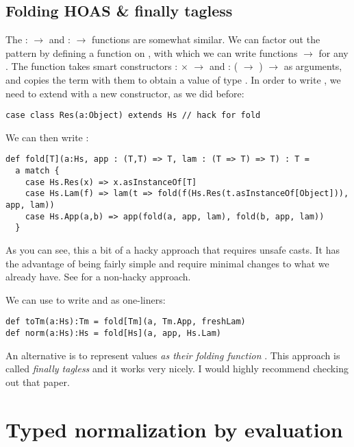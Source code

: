 \subsection{Folding HOAS \& finally tagless}

The  :  $\to$  and  :  $\to$  functions are somewhat similar.
We can factor out the pattern by defining a  function on , with which we can write functions  $\to$  for any .
The  function takes smart constructors  :  $\times$  $\to$  and  : ( $\to$ ) $\to$  as arguments, and copies the  term with them to obtain a value of type .
In order to write , we need to extend  with a new constructor, as we did before:

\begin{lstlisting}
case class Res(a:Object) extends Hs // hack for fold
\end{lstlisting}

We can then write :

\begin{lstlisting}
def fold[T](a:Hs, app : (T,T) => T, lam : (T => T) => T) : T =
  a match {
    case Hs.Res(x) => x.asInstanceOf[T]
    case Hs.Lam(f) => lam(t => fold(f(Hs.Res(t.asInstanceOf[Object])), app, lam))
    case Hs.App(a,b) => app(fold(a, app, lam), fold(b, app, lam))
  }
\end{lstlisting}

As you can see, this a bit of a hacky approach that requires unsafe casts.
It has the advantage of being fairly simple and require minimal changes to what we already have.
See \cite{BoxesGoBananas2003} for a non-hacky approach.

We can use  to write  and  as one-liners:

\begin{lstlisting}
def toTm(a:Hs):Tm = fold[Tm](a, Tm.App, freshLam)
def norm(a:Hs):Hs = fold[Hs](a, app, Hs.Lam)
\end{lstlisting}

An alternative is to represent  values \emph{as their folding function} .
This approach is called \emph{finally tagless} \cite{FinallyTagless2007} and it works very nicely.
I would highly recommend checking out that paper.

\section{Typed normalization by evaluation}

